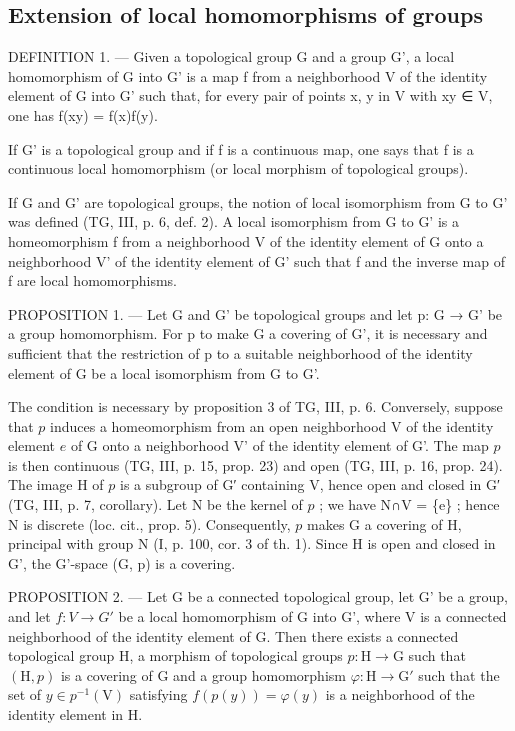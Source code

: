 \subsection{Extension of local homomorphisms of groups}

DEFINITION 1. --- Given a topological group G and a group G', a local homomorphism of G into G' is a map f from a neighborhood V of the identity element of G into G' such that, for every pair of points x, y in V with xy ∈ V, one has f(xy) = f(x)f(y).

If G' is a topological group and if f is a continuous map, one says that f is a continuous local homomorphism (or local morphism of topological groups).

If G and G' are topological groups, the notion of local isomorphism from G to G' was defined (TG, III, p. 6, def. 2). A local isomorphism from G to G' is a homeomorphism f from a neighborhood V of the identity element of G onto a neighborhood V' of the identity element of G' such that f and the inverse map of f are local homomorphisms.

PROPOSITION 1. --- Let G and G' be topological groups and let p: G → G' be a group homomorphism. For p to make G a covering of G', it is necessary and sufficient that the restriction of p to a suitable neighborhood of the identity element of G be a local isomorphism from G to G'.

The condition is necessary by proposition 3 of TG, III, p. 6. Conversely, suppose that \(p\) induces a homeomorphism from an open neighborhood V of the identity element \(e\) of G onto a neighborhood V' of the identity element of G'. The map \(p\) is then continuous (TG, III, p. 15, prop. 23) and open (TG, III, p. 16, prop. 24). The image H of \(p\) is a subgroup of G′ containing V, hence open and closed in G′ (TG, III, p. 7, corollary). Let N be the kernel of \(p\) ; we have N∩V = \{e\} ; hence N is discrete (loc. cit., prop. 5). Consequently, \(p\) makes G a covering of H, principal with group N (I, p. 100, cor. 3 of th. 1). Since H is open and closed in G', the G'-space (G, p) is a covering.

PROPOSITION 2. --- Let G be a connected topological group, let G' be a group, and let \(f: V \to G'\) be a local homomorphism of G into G', where V is a connected neighborhood of the identity element of G. Then there exists a connected topological group H, a morphism of topological groups \(p\colon\mathrm{H}\to\mathrm{G}\) such that \((\mathrm{H},p)\) is a covering of G and a group homomorphism \(\varphi\colon\mathrm{H}\to\mathrm{G}'\) such that the set of \(y\in p^{-1}(\mathrm{V})\) satisfying \(f(p(y))=\varphi(y)\) is a neighborhood of the identity element in H.

